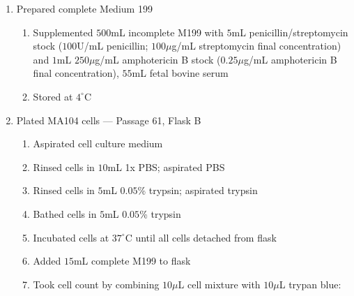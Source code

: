 \begin{enumerate}
	\item Prepared complete Medium 199
		\begin{enumerate}
				\item Supplemented $500$mL incomplete M199 with $5$mL penicillin/streptomycin stock ($100$U/mL penicillin; $100\mu$g/mL streptomycin final concentration) and $1$mL $250\mu$g/mL amphotericin B stock ($0.25\mu$g/mL amphotericin B final concentration), $55$mL fetal bovine serum
				\item Stored at $4^{\circ}$C
		\end{enumerate}
	\item Plated MA104 cells --- Passage 61, Flask B
		\begin{enumerate}
			\item Aspirated cell culture medium
			\item Rinsed cells in $10$mL 1x PBS; aspirated PBS
			\item Rinsed cells in $5$mL $0.05$\% trypsin; aspirated trypsin
			\item Bathed cells in $5$mL $0.05$\% trypsin
			\item Incubated cells at $37^{\circ}$C until all cells detached from flask
			\item Added $15$mL complete M199 to flask
			\item Took cell count by combining $10\mu$L cell mixture with $10\mu$L trypan blue:
			

\end{enumerate}
\end{enumerate}
